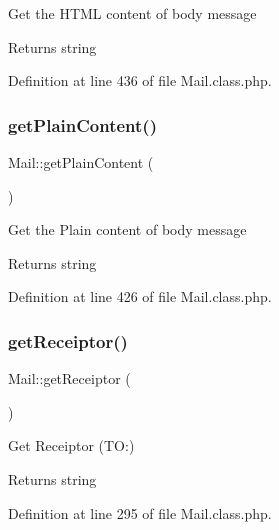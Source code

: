 Get the H\+T\+ML content of body message

\begin{DoxyReturn}{Returns}
string 
\end{DoxyReturn}


Definition at line 436 of file Mail.\+class.\+php.

\mbox{\label{classMail_ac1a5a2b325a14e6331f13d2b2b18d9f8}} 
\subsubsection{\texorpdfstring{get\+Plain\+Content()}{getPlainContent()}}
{\footnotesize\ttfamily Mail\+::get\+Plain\+Content (\begin{DoxyParamCaption}{ }\end{DoxyParamCaption})}

Get the Plain content of body message

\begin{DoxyReturn}{Returns}
string 
\end{DoxyReturn}


Definition at line 426 of file Mail.\+class.\+php.

\mbox{\label{classMail_ae334a42923b5cd5d4c7012ba944c3841}} 
\subsubsection{\texorpdfstring{get\+Receiptor()}{getReceiptor()}}
{\footnotesize\ttfamily Mail\+::get\+Receiptor (\begin{DoxyParamCaption}{ }\end{DoxyParamCaption})}

Get Receiptor (TO\+:)

\begin{DoxyReturn}{Returns}
string 
\end{DoxyReturn}


Definition at line 295 of file Mail.\+class.\+php.

\mbox{\label{classMail_a25c8d959a398cdfe3919d9fd634358d7}} 
